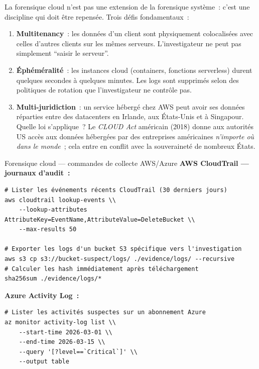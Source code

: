 La forensique cloud n'est pas une extension de la forensique système~:
c'est une discipline qui doit être repensée. Trois défis fondamentaux~:

\begin{enumerate}
    \item \textbf{Multitenancy}~: les données d'un client sont physiquement
          colocalisées avec celles d'autres clients sur les mêmes serveurs.
          L'investigateur ne peut pas simplement ``saisir le serveur''.

    \item \textbf{Éphéméralité}~: les instances cloud (containers,
          fonctions serverless) durent quelques secondes à quelques minutes.
          Les logs sont supprimés selon des politiques de rotation que
          l'investigateur ne contrôle pas.

    \item \textbf{Multi-juridiction}~: un service hébergé chez AWS peut
          avoir ses données réparties entre des datacenters en Irlande,
          aux États-Unis et à Singapour. Quelle loi s'applique~?
          Le \textit{CLOUD Act} américain (2018) donne aux autorités US
          accès aux données hébergées par des entreprises américaines
          \emph{n'importe où dans le monde}~; cela entre en conflit avec
          la souveraineté de nombreux États.
\end{enumerate}

\begin{boxoutils}{Forensique cloud --- commandes de collecte AWS/Azure}
\textbf{AWS CloudTrail --- journaux d'audit~:}
\begin{lstlisting}[language=bash_forensique]
# Lister les événements récents CloudTrail (30 derniers jours)
aws cloudtrail lookup-events \\
    --lookup-attributes AttributeKey=EventName,AttributeValue=DeleteBucket \\
    --max-results 50

# Exporter les logs d'un bucket S3 spécifique vers l'investigation
aws s3 cp s3://bucket-suspect/logs/ ./evidence/logs/ --recursive
# Calculer les hash immédiatement après téléchargement
sha256sum ./evidence/logs/*
\end{lstlisting}

\textbf{Azure Activity Log~:}
\begin{lstlisting}[language=bash_forensique]
# Lister les activités suspectes sur un abonnement Azure
az monitor activity-log list \\
    --start-time 2026-03-01 \\
    --end-time 2026-03-15 \\
    --query '[?level==`Critical`]' \\
    --output table
\end{lstlisting}
\end{boxoutils}

